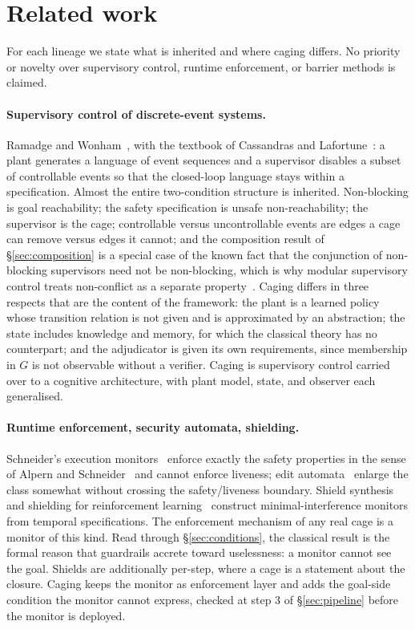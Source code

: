\section{Related work}
\label{sec:related}

For each lineage we state what is inherited and where caging differs. No priority or novelty over supervisory control, runtime enforcement, or barrier methods is claimed.

\paragraph{Supervisory control of discrete-event systems.}
Ramadge and Wonham~\citep{ramadge1987,ramadge1989}, with the textbook of Cassandras and Lafortune~\citep{cassandras2008}: a plant generates a language of event sequences and a supervisor disables a subset of controllable events so that the closed-loop language stays within a specification. Almost the entire two-condition structure is inherited. Non-blocking is goal reachability; the safety specification is unsafe non-reachability; the supervisor is the cage; controllable versus uncontrollable events are edges a cage can remove versus edges it cannot; and the composition result of \S\ref{sec:composition} is a special case of the known fact that the conjunction of non-blocking supervisors need not be non-blocking, which is why modular supervisory control treats non-conflict as a separate property~\citep{wonham1988modular}. Caging differs in three respects that are the content of the framework: the plant is a learned policy whose transition relation is not given and is approximated by an abstraction; the state includes knowledge and memory, for which the classical theory has no counterpart; and the adjudicator is given its own requirements, since membership in $G$ is not observable without a verifier. Caging is supervisory control carried over to a cognitive architecture, with plant model, state, and observer each generalised.

\paragraph{Runtime enforcement, security automata, shielding.}
Schneider's execution monitors~\citep{schneider2000} enforce exactly the safety properties in the sense of Alpern and Schneider~\citep{alpern1985} and cannot enforce liveness; edit automata~\citep{ligatti2005} enlarge the class somewhat without crossing the safety/liveness boundary. Shield synthesis~\citep{bloem2015shield} and shielding for reinforcement learning~\citep{alshiekh2018} construct minimal-interference monitors from temporal specifications. The enforcement mechanism of any real cage is a monitor of this kind. Read through \S\ref{sec:conditions}, the classical result is the formal reason that guardrails accrete toward uselessness: a monitor cannot see the goal. Shields are additionally per-step, where a cage is a statement about the closure. Caging keeps the monitor as enforcement layer and adds the goal-side condition the monitor cannot express, checked at step 3 of \S\ref{sec:pipeline} before the monitor is deployed.

